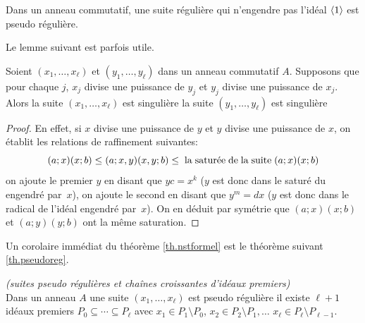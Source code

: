 \begin{proposition} 
\label{prop.regseq} Dans un anneau commutatif, une suite 
régulière qui n'engendre pas l'idéal $\left\langle{1}\right\rangle$ est pseudo régulière.
\end{proposition}


Le lemme suivant est parfois utile.

\begin{lemma} 
\label{lem.pseudoreg} 
Soient   $(x_1,\ldots,x_\ell)$ et  $(y_1,\ldots,y_\ell)$ dans un anneau 
commutatif $A$. 
Supposons que pour chaque $j$, $x_j$ divise une puissance de $y_j$ 
et $y_j$ divise une puissance de $x_j$. 
Alors la suite  $(x_1,\ldots,x_\ell)$ est singulière \ssi
la suite  $(y_1,\ldots,y_\ell)$ est singulière
\end{lemma}
\begin{proof}
En effet, si   $x$ divise une puissance de $y$  et  $y$
divise une puissance de $x$, 
on établit les relations de raffinement suivantes:
$$(a;x)(x;b)  \leq  (a;x,y)(x,y;b) \leq  
         {\rm \;la\; satur\aigu ee\; de\; la\; suite\; }   (a;x)(x;b)$$
on ajoute le premier  $y$ en disant que  $yc=x^k$
  ($y$ est donc dans le saturé du \mo engendré par~$x$),  
on ajoute le second en disant que      $y^m=dx$
  ($y$  est donc dans le radical de l'idéal engendré par~$x$).
On en déduit par symétrie que $(a;x)(x;b)$ et $(a;y)(y;b)$ ont la 
même saturation. 
\end{proof}

Un corolaire immédiat du théorème \ref{th.nstformel} est le 
théorème suivant \ref{th.pseudoreg}.

\begin{theorem} 
\label{th.pseudoreg} 
{\em (suites pseudo régulières et chaînes croissantes d'idéaux 
premiers)}\\ \Tcgi
Dans un anneau $A$ une suite $(x_1,\ldots,x_\ell)$ est pseudo 
régulière \ssi il existe  $\ell+1$ idéaux premiers 
$P_0\subseteq \cdots\subseteq P_\ell$ 
avec $x_1\in P_1\setminus P_0$, $x_2\in P_2\setminus P_1, \ldots$  
$x_\ell\in P_\ell\setminus P_{\ell-1}$.
\end{theorem}

